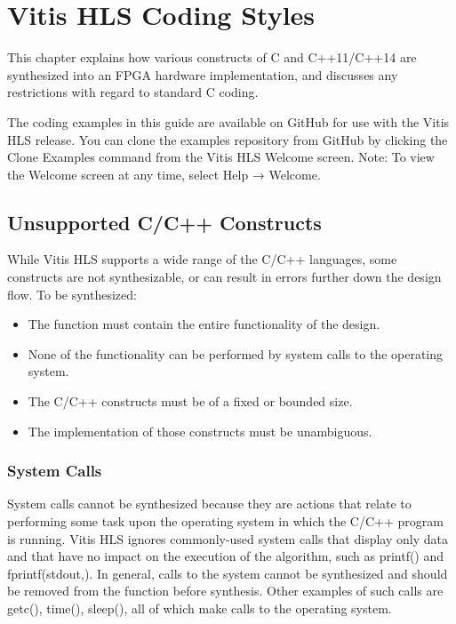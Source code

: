 \clearpage
\section{Vitis HLS Coding Styles}


This chapter explains how various constructs of C and C++11/C++14 are synthesized into an FPGA hardware implementation, and discusses any restrictions with regard to standard C coding.

The coding examples in this guide are available on GitHub for use with the Vitis HLS release. You can clone the examples repository from GitHub by clicking the Clone Examples command from the Vitis HLS Welcome screen.
Note: To view the Welcome screen at any time, select Help → Welcome.

\subsection{Unsupported C/C++ Constructs}
While Vitis HLS supports a wide range of the C/C++ languages, some constructs are not synthesizable, or can result in errors further down the design flow. To be synthesized:

\begin{itemize}
  \item The function must contain the entire functionality of the design.
  \item None of the functionality can be performed by system calls to the operating system.
  \item The C/C++ constructs must be of a fixed or bounded size.
  \item The implementation of those constructs must be unambiguous.
\end{itemize}

\subsubsection{System Calls}
System calls cannot be synthesized because they are actions that relate to performing some task upon the operating system in which the C/C++ program is running. Vitis HLS ignores commonly-used system calls that display only data and that have no impact on the execution of the algorithm, such as printf() and fprintf(stdout,). In general, calls to
the system cannot be synthesized and should be removed from the function before synthesis. Other examples of such calls are getc(), time(), sleep(), all of which make calls to the operating system.


